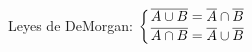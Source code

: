 \documentclass{article} %
\begin{document}
Leyes de DeMorgan:
$\displaystyle{ \left\{
	{ \overline{A \cup B} = \overline{A} \cap \overline{B}
		\atop
		\overline{A \cap B} = \overline{A}\cup \overline{B}
	}
	\right.} $
\end{document}
